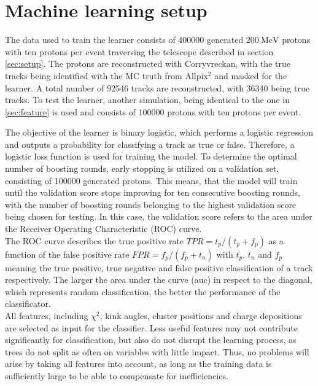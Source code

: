 \section{Machine learning setup}
The data used to train the learner %
consists of 400000 generated $\SI{200}{\mega\eV}$ protons with ten protons per event
traversing the telescope described in section \ref{sec:setup}. The protons
are reconstructed with Corryvreckan, with the true tracks being identified with the MC truth from Allpix$^2$ and masked for the learner. A total number of 92546 tracks
are reconstructed, with 36340 being true tracks.
To test the learner, another simulation, being identical to the one in \ref{sec:feature} is used and consists of 100000 protons with ten protons per event.

The objective of the learner is binary logistic, which performs a logistic regression and outputs a probability for classifying a track as true or false.
Therefore, a logistic loss function is used for training the model.
To determine the optimal number of boosting rounds, early stopping is utilized on a validation set, consisting of 100000 generated protons. This means, that
the model will train until the validation score stops improving for ten consecutive boosting rounds, with the number
of boosting rounds belonging to the highest validation score being chosen for testing. In this case, the validation score refers to the area under the
Receiver Operating Characteristic (ROC) curve. \\
The ROC curve describes the true positive rate $TPR = t_p/(t_p + f_p)$ as a function of the false positive rate $FPR = f_p/(f_p + t_n)$ with
$t_p$, $t_n$ and $f_p$ meaning the true positive, true negative and false positive classification of a track respectively. The larger the area under the curve (auc) in respect
to the diagonal, which represents random classification, the better the performance of the classificator. \\
All features, including $\chi^2$, kink angles, cluster positions and charge depositions are selected as input for the classifier. Less useful features
may not contribute significantly for classification, but also do not disrupt the learning process, as trees do not split as often on variables with little impact.
Thus, no problems will arise by taking all features into account, as long as the training data is sufficiently large to be able to compensate for inefficiencies.

